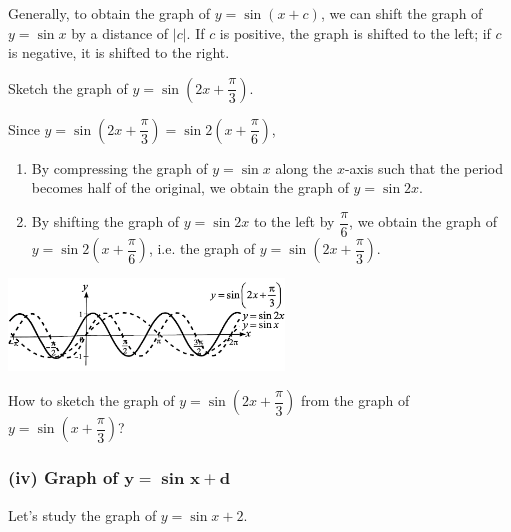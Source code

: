 \documentclass{report}
\begin{document}
        Generally, to obtain the graph of $y=\sin (x+c)$, we can shift the graph of $y=\sin x$ by a distance of $|c|$. If $c$ is positive, the graph is shifted to the left; if $c$ is negative, it is shifted to the right.
        
        \begin{question}
            Sketch the graph of $y=\sin \left(2x + \dfrac{\pi}{3}\right)$.

            \sol{}
            
            \noindent Since $y = \sin\left(2x + \dfrac{\pi}{3}\right) = \sin 2\left(x + \dfrac{\pi}{6}\right)$, 
            \begin{enumerate}[label=(\arabic*), leftmargin=*, topsep=0pt]
                \item By compressing the graph of $y=\sin x$ along the $x$-axis such that the period becomes half of the original, we obtain the graph of $y=\sin 2 x$.
                \item By shifting the graph of $y=\sin 2 x$ to the left by $\dfrac{\pi}{6}$, we obtain the graph of $y=\sin 2\left(x+\dfrac{\pi}{6}\right)$, i.e. the graph of $y=\sin \left(2 x+\dfrac{\pi}{3}\right)$.
            \end{enumerate}
            \begin{center}
                \includegraphics[width=0.55\textwidth]{assets/9-28.jpg}
            \end{center}
        \end{question}
        \begin{think}
            
            \noindent How to sketch the graph of $y=\sin \left(2x+\dfrac{\pi}{3}\right)$ from the graph of $y=\sin \left(x+\dfrac{\pi}{3}\right)$?
        \end{think}

        \newpage
        \subsubsection*{(iv) Graph of $\mathbf{y=\text{ sin } x+d}$}

        Let's study the graph of $y=\sin x+2$.
\end{document}
